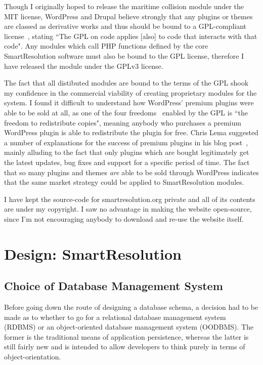 Though I originally hoped to release the maritime collision module under the MIT license, WordPress and Drupal believe strongly that any plugins or themes are classed as derivative works and thus should be bound to a GPL-compliant license~\cite{wordpress:gpl}, stating ``The GPL on code applies [also] to code that interacts with that code". Any modules which call PHP functions defined by the core SmartResolution software must also be bound to the GPL license, therefore I have released the module under the GPLv3 license.

The fact that all distibuted modules are bound to the terms of the GPL shook my confidence in the commercial viability of creating proprietary modules for the system. I found it difficult to understand how WordPress' premium plugins were able to be sold at all, as one of the four freedoms~\cite{fourFreedoms} enabled by the GPL is ``the freedom to redistribute copies", meaning anybody who purchases a premium WordPress plugin is able to redistribute the plugin for free. Chris Lema suggested a number of explanations for the success of premium plugins in his blog post~\cite{chrisLema}, mainly alluding to the fact that only plugins which are bought legitimately get the latest updates, bug fixes and support for a specific period of time. The fact that so many plugins and themes \emph{are} able to be sold through WordPress indicates that the same market strategy could be applied to SmartResolution modules.

I have kept the source-code for smartresolution.org private and all of its contents are under my copyright. I saw no advantage in making the website open-source, since I'm not encouraging anybody to download and re-use the website itself.

\section{Design: SmartResolution}

\subsection{Choice of Database Management System}

Before going down the route of designing a database schema, a decision had to be made as to whether to go for a relational database management system (RDBMS) or an object-oriented database management system (OODBMS). The former is the traditional means of application persistence, whereas the latter is still fairly new and is intended to allow developers to think purely in terms of object-orientation.

